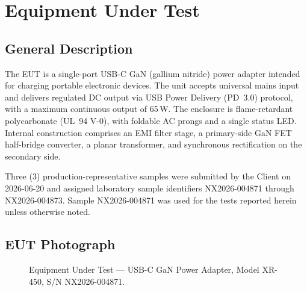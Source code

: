 \section{Equipment Under Test}

\subsection{General Description}
The EUT is a single-port USB-C GaN (gallium nitride) power adapter intended for charging portable electronic devices. The unit accepts universal mains input and delivers regulated DC output via USB Power Delivery (PD~3.0) protocol, with a maximum continuous output of 65\,W. The enclosure is flame-retardant polycarbonate (UL~94 V-0), with foldable AC prongs and a single status LED. Internal construction comprises an EMI filter stage, a primary-side GaN FET half-bridge converter, a planar transformer, and synchronous rectification on the secondary side.

Three (3) production-representative samples were submitted by the Client on 2026-06-20 and assigned laboratory sample identifiers NX2026-004871 through NX2026-004873. Sample NX2026-004871 was used for the tests reported herein unless otherwise noted.

\subsection{EUT Photograph}
\begin{figure}[H]
\centering
{}
\caption{Equipment Under Test --- USB-C GaN Power Adapter, Model XR-450, S/N NX2026-004871.}
\end{figure}

